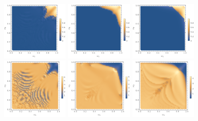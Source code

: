 \documentclass[11pt]{book}
\begin{document}
\begin{figure}[p]
    \centering
    \includegraphics[width=0.3\textwidth]{plot/energy-ratio-phi6-1d.png}
    \includegraphics[width=0.3\textwidth]{plot/energy-ratio-phi6-2d.png}
    \includegraphics[width=0.3\textwidth]{plot/energy-ratio-phi6-3d.png} \\
    \includegraphics[width=0.3\textwidth]{plot/r_max-phi6-1d.png}
    \includegraphics[width=0.3\textwidth]{plot/r_max-phi6-2d.png}
    \includegraphics[width=0.3\textwidth]{plot/r_max-phi6-3d.png} \\

\end{figure}
\end{document}
